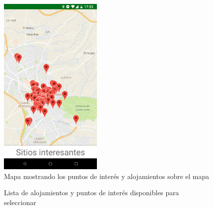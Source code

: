 \newpage
\begin{figure}[H]
	\centering
	\includegraphics[width=50mm]{imagenes/main_activity_map}
	\caption{Mapa mostrando los puntos de interés y alojamientos sobre el mapa}
	\label{fig:main_activity_map}
\end{figure}
\vspace{0.06in}
\begin{figure}[H]
	\centering
	\caption{Lista de alojamientos y puntos de interés disponibles para seleccionar}
	\label{fig:main_activity_list}
\end{figure}

